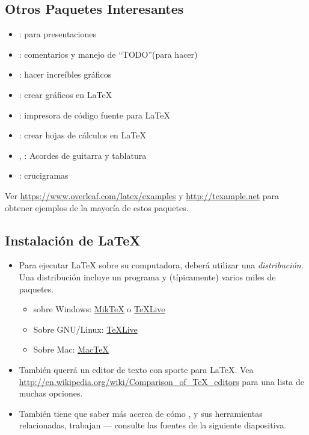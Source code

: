 \documentclass{beamer}
\begin{document}
\subsection{Otros Paquetes Interesantes}
\begin{frame}{\insertsubsection}
  \begin{itemize}
  \item {}: para presentaciones
  \item {}: comentarios y manejo de ``TODO''(para hacer)
  \item {}: hacer increíbles gráficos
  \item {}: crear gráficos en \LaTeX
  \item {}: impresora de código fuente para \LaTeX
  \item {}: crear hojas de cálculos en \LaTeX
  \item {}, : Acordes de guitarra y tablatura
  \item {}: crucigramas
  \end{itemize}
  Ver \url{https://www.overleaf.com/latex/examples} y \url{http://texample.net}
  para obtener ejemplos de la mayoría de estos paquetes.
\end{frame}

\subsection{Instalación de  \LaTeX{}}
\begin{frame}{\insertsubsection}
  \begin{itemize}
  \item Para ejecutar \LaTeX{} sobre su computadora, deberá utilizar
    una \emph{distribución}. Una distribución incluye un
    programa  y (típicamente) varios miles de paquetes.
    \begin{itemize}
    \item sobre Windows: \href{http://miktex.org/}{Mik\TeX} o \href{http://tug.org/texlive/}{\TeX Live}
    \item Sobre GNU/Linux: \href{http://tug.org/texlive/}{\TeX Live}
    \item Sobre Mac: \href{http://tug.org/mactex/}{Mac\TeX}
    \end{itemize}
  \item También querrá un editor de texto con sporte para
\LaTeX{}. Vea
\url{http://en.wikipedia.org/wiki/Comparison_of_TeX_editors} para una
lista de muchas opciones.
  \item También tiene que saber más acerca de cómo  , y sus
    herramientas relacionadas, trabajan --- consulte las fuentes de la
    siguiente diapositiva. 
  \end{itemize}
\end{frame}
\end{document}
